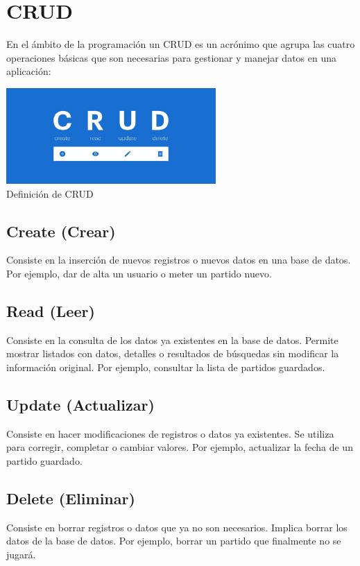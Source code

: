 

\section{CRUD}
En el ámbito de la programación un CRUD es un acrónimo que agrupa las cuatro operaciones básicas que son necesarias para gestionar y manejar datos en una aplicación:

\begin{center}
  \includegraphics[width=0.6\textwidth]{img/crud-logo.jpg}\\
  \small Definición de CRUD
\end{center}

\subsection{Create (Crear)}
Consiste en la inserción de nuevos registros o nuevos datos en una base de datos. Por ejemplo, dar de alta un usuario o meter un partido nuevo.

\subsection{Read (Leer)}
Consiste en la consulta de los datos ya existentes en la base de datos. Permite mostrar listados con datos, detalles o resultados de búsquedas sin modificar la información original. Por ejemplo, consultar la lista de partidos guardados.

\subsection{Update (Actualizar)}
Consiste en hacer modificaciones de registros o datos ya existentes. Se utiliza para corregir, completar o cambiar valores. Por ejemplo, actualizar la fecha de un partido guardado.

\subsection{Delete (Eliminar)}
Consiste en borrar registros o datos que ya no son necesarios. Implica borrar los datos de la base de datos. Por ejemplo, borrar un partido que finalmente no se jugará.


